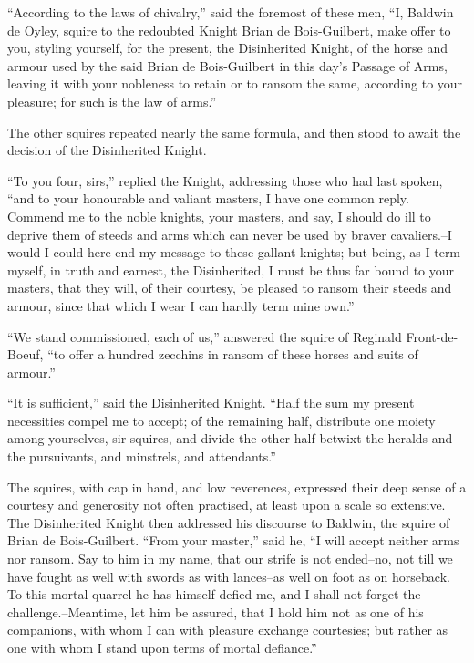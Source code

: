 ``According to the laws of chivalry,'' said the foremost of these men,
``I, Baldwin de Oyley, squire to the redoubted Knight Brian de
Bois-Guilbert, make offer to you, styling yourself, for the present, the
Disinherited Knight, of the horse and armour used by the said Brian de
Bois-Guilbert in this day's Passage of Arms, leaving it with your
nobleness to retain or to ransom the same, according to your pleasure;
for such is the law of arms.''

The other squires repeated nearly the same formula, and then stood to
await the decision of the Disinherited Knight.

``To you four, sirs,'' replied the Knight, addressing those who had last
spoken, ``and to your honourable and valiant masters, I have one common
reply. Commend me to the noble knights, your masters, and say, I should
do ill to deprive them of steeds and arms which can never be used by
braver cavaliers.--I would I could here end my message to these gallant
knights; but being, as I term myself, in truth and earnest, the
Disinherited, I must be thus far bound to your masters, that they will,
of their courtesy, be pleased to ransom their steeds and armour, since
that which I wear I can hardly term mine own.''

``We stand commissioned, each of us,'' answered the squire of Reginald
Front-de-Boeuf, ``to offer a hundred zecchins in ransom of these horses
and suits of armour.''

``It is sufficient,'' said the Disinherited Knight. ``Half the sum my
present necessities compel me to accept; of the remaining half,
distribute one moiety among yourselves, sir squires, and divide the
other half betwixt the heralds and the pursuivants, and minstrels, and
attendants.''

The squires, with cap in hand, and low reverences, expressed their deep
sense of a courtesy and generosity not often practised, at least upon a
scale so extensive. The Disinherited Knight then addressed his discourse
to Baldwin, the squire of Brian de Bois-Guilbert. ``From your master,''
said he, ``I will accept neither arms nor ransom. Say to him in my name,
that our strife is not ended--no, not till we have fought as well with
swords as with lances--as well on foot as on horseback. To this mortal
quarrel he has himself defied me, and I shall not forget the
challenge.--Meantime, let him be assured, that I hold him not as one of
his companions, with whom I can with pleasure exchange courtesies; but
rather as one with whom I stand upon terms of mortal defiance.''

